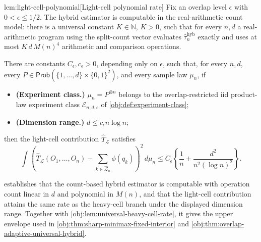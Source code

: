\begin{lemmav}{lem:light-cell-polynomial}[Light-cell polynomial rate]
Fix an overlap level \(\epsilon\) with \(0<\epsilon\le 1/2\). The hybrid estimator is computable in the real-arithmetic count model: there is a universal constant \(K\in\mathbb N\), \(K>0\), such that for every \(n,d\) a real-arithmetic program using the split-count vector evaluates \(\widehat\tau_n^{\mathrm{hyb}}\) exactly and uses at most \(K\,d\,M(n)^4\) arithmetic and comparison operations.

There are constants \(C_\epsilon,c_\epsilon>0\), depending only on \(\epsilon\), such that, for every \(n,d\), every \(P\in\mathsf{Prob}(\{1,\ldots,d\}\times\{0,1\}^2)\), and every sample law \(\mu_n\), if
\begin{itemize}
\item \textbf{(Experiment class.)} \(\mu_n=P^{\otimes n}\) belongs to the overlap-restricted iid product-law experiment class \(\mathcal E_{n,d,\epsilon}\) of \cref{obj:def:experiment-class};
\item \textbf{(Dimension range.)} \(d\le c_\epsilon n\log n\);
\end{itemize}
then the light-cell contribution \(\widehat T_{\mathcal L}\) satisfies
\[
\int\left(\widehat T_{\mathcal L}(O_1,\ldots,O_n)
-\sum_{k\in\widehat{\mathcal L}_n}\phi(q_k)\right)^2\,d\mu_n
\le
C_\epsilon\left\{\frac1n+\frac{d^2}{n^2(\log n)^2}\right\}.
\]
\end{lemmav}

 establishes that the count-based hybrid estimator is computable with operation count linear in \(d\) and polynomial in \(M(n)\), and that the light-cell contribution attains the same rate as the heavy-cell branch under the displayed dimension range. Together with \cref{obj:lem:universal-heavy-cell-rate}, it gives the upper envelope used in \cref{obj:thm:sharp-minimax-fixed-interior} and \cref{obj:thm:overlap-adaptive-universal-hybrid}.
